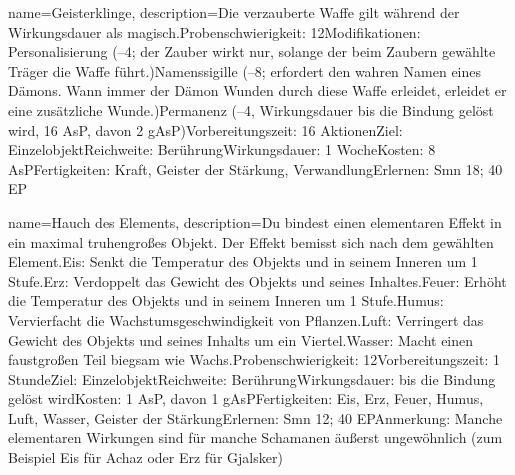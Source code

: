 {
    name={Geisterklinge},
    description={Die verzauberte Waffe gilt während der Wirkungsdauer als magisch.\newline Probenschwierigkeit: 12\newline Modifikationen: Personalisierung (–4; der Zauber wirkt nur, solange der beim Zaubern gewählte Träger die Waffe führt.)\newline Namenssigille (–8; erfordert den wahren Namen eines Dämons. Wann immer der Dämon Wunden durch diese Waffe erleidet, erleidet er eine zusätzliche Wunde.)\newline Permanenz (–4, Wirkungsdauer bis die Bindung gelöst wird, 16 AsP, davon 2 gAsP)\newline Vorbereitungszeit: 16 Aktionen\newline Ziel: Einzelobjekt\newline Reichweite: Berührung\newline Wirkungsdauer: 1 Woche\newline Kosten: 8 AsP\newline Fertigkeiten: Kraft, Geister der Stärkung, Verwandlung\newline Erlernen: Smn 18; 40 EP}
}


{
    name={Hauch des Elements},
    description={Du bindest einen elementaren Effekt in ein maximal truhengroßes Objekt. Der Effekt bemisst sich nach dem gewählten Element.\newline Eis: Senkt die Temperatur des Objekts und in seinem Inneren um 1 Stufe.\newline Erz: Verdoppelt das Gewicht des Objekts und seines Inhaltes.\newline Feuer: Erhöht die Temperatur des Objekts und in seinem Inneren um 1 Stufe.\newline Humus: Vervierfacht die Wachstumsgeschwindigkeit von Pflanzen.\newline Luft: Verringert das Gewicht des Objekts und seines Inhalts um ein Viertel.\newline Wasser: Macht einen faustgroßen Teil biegsam wie Wachs.\newline Probenschwierigkeit: 12\newline Vorbereitungszeit: 1 Stunde\newline Ziel: Einzelobjekt\newline Reichweite: Berührung\newline Wirkungsdauer: bis die Bindung gelöst wird\newline Kosten: 1 AsP, davon 1 gAsP\newline Fertigkeiten: Eis, Erz, Feuer, Humus, Luft, Wasser, Geister der Stärkung\newline Erlernen: Smn 12; 40 EP\newline Anmerkung: Manche elementaren Wirkungen sind für manche Schamanen äußerst ungewöhnlich (zum Beispiel Eis für Achaz oder Erz für Gjalsker)}
}


